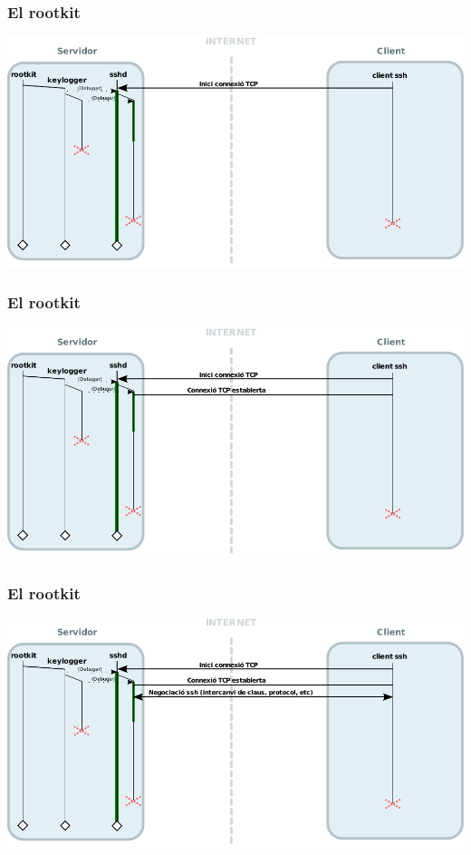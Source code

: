 \documentclass{beamer}
\begin{document}
\begin{frame}
	\frametitle{El rootkit}
	\includegraphics[scale=0.65,keepaspectratio]{sshd_keylogger_5.pdf}
\end{frame}

\begin{frame}
	\frametitle{El rootkit}
	\includegraphics[scale=0.65,keepaspectratio]{sshd_keylogger_6.pdf}
\end{frame}

\begin{frame}
	\frametitle{El rootkit}
	\includegraphics[scale=0.65,keepaspectratio]{sshd_keylogger_7.pdf}
\end{frame}
\end{document}
